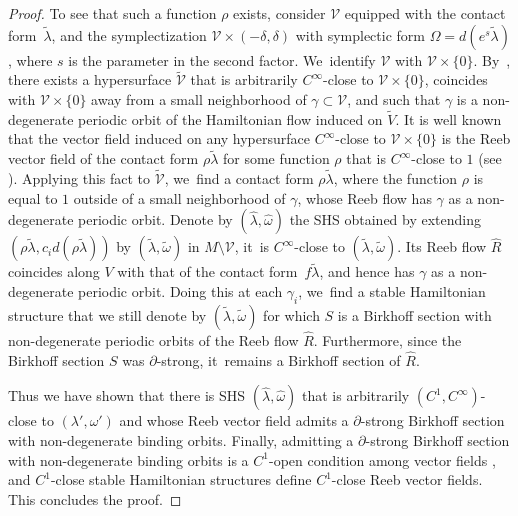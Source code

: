 \begin{proof}
To see that such a function $\rho$ exists, consider $\mathcal V$ equipped with the contact form~$\widetilde\lambda$, and the symplectization $\mathcal V\times (-\delta,\delta)$ with symplectic form $\Omega= d(e^s\widetilde\lambda)$, where $s$ is the parameter in the second factor. We~identify $\mathcal V$ with $\mathcal V\times \{0\}$. By~\cite[Lem.\,19]{Ro}, there exists a hypersurface $\widetilde{\mathcal V}$ that is arbitrarily $C^\infty$-close to $\mathcal V\times \{0\}$, coincides with $\mathcal V\times \{0\}$ away from a small neighborhood of $\gamma\subset \mathcal V$, and such that $\gamma$ is a non-degenerate periodic orbit of the Hamiltonian flow induced on $\widetilde V$. It is well known that the vector field induced on any hypersurface $C^\infty$-close to $\mathcal V\times \{0\}$ is the Reeb vector field of the contact form $\rho \widetilde\lambda$ for some function $\rho$ that is $C^\infty$-close to $1$ (see \eg \cite[\S 6]{HWZ2}). Applying this fact to $\widetilde{\mathcal V}$, we~find a contact form $\rho \widetilde \lambda$, where the function $\rho$ is equal to $1$ outside of a small neighborhood of $\gamma$, whose Reeb flow has $\gamma$ as a non-degenerate periodic orbit. Denote by $(\hat \lambda, \hat \omega)$ the SHS obtained by extending $(\rho \widetilde \lambda, c_i d(\rho \widetilde \lambda))$ by $(\widetilde \lambda,\widetilde \omega)$ in $M\setminus \mathcal V$, it~is $C^\infty$-close to $(\widetilde \lambda,\widetilde \omega)$. Its Reeb flow $\hat R$ coincides along $V$ with that of the contact form~$f\widetilde \lambda$, and hence has $\gamma$ as a non-degenerate periodic orbit. Doing this at each $\gamma_i$, we~find a stable Hamiltonian structure that we still denote by $(\widetilde \lambda, \widetilde \omega)$ for which $S$ is a Birkhoff section with non-degenerate periodic orbits of the Reeb flow $\hat R$. Furthermore, since the Birkhoff section $S$ was $\partial$-strong, it~remains a Birkhoff section of $\hat R$.

Thus we have shown that there is SHS $(\hat \lambda,\hat \omega)$ that is arbitrarily $(C^1, C^\infty)$-close to $(\lambda',\omega')$ and whose Reeb vector field admits a $\partial$-strong Birkhoff section with non-degenerate binding orbits. Finally, admitting a $\partial$-strong Birkhoff section with non-degenerate binding orbits is a $C^1$-open condition among vector fields \cite[Prop.\,5.1]{CDHR}, and $C^1$-close stable Hamiltonian structures define $C^1$-close Reeb vector fields. This concludes the proof.
\end{proof}

